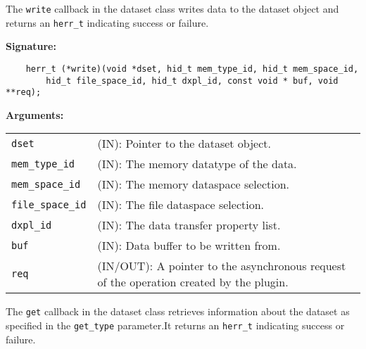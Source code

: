 The \texttt{write} callback in the dataset class writes data to
the dataset object and returns an \texttt{herr\_t} indicating success or
failure.\bigskip

\begin{mdframed}[style=bgbox]
\textbf{Signature:}
\begin{lstlisting}
    herr_t (*write)(void *dset, hid_t mem_type_id, hid_t mem_space_id, 
        hid_t file_space_id, hid_t dxpl_id, const void * buf, void **req);
\end{lstlisting}

\textbf{Arguments:}\\
\begin{tabular}{l p{13.5cm}}
  \texttt{dset} & (IN): Pointer to the dataset object.\\
  \texttt{mem\_type\_id} & (IN): The memory datatype of the data.\\
  \texttt{mem\_space\_id} & (IN): The memory dataspace selection.\\
  \texttt{file\_space\_id} & (IN): The file dataspace selection.\\
  \texttt{dxpl\_id} & (IN): The data transfer property list.\\
  \texttt{buf} & (IN): Data buffer to be written from.\\
  \texttt{req} & (IN/OUT): A pointer to the asynchronous request of the
  operation created by the plugin.\\
\end{tabular}
\end{mdframed}

The \texttt{get} callback in the dataset class retrieves
information about the dataset as specified in the \texttt{get\_type}
parameter.It returns an \texttt{herr\_t} indicating success or failure.\bigskip

